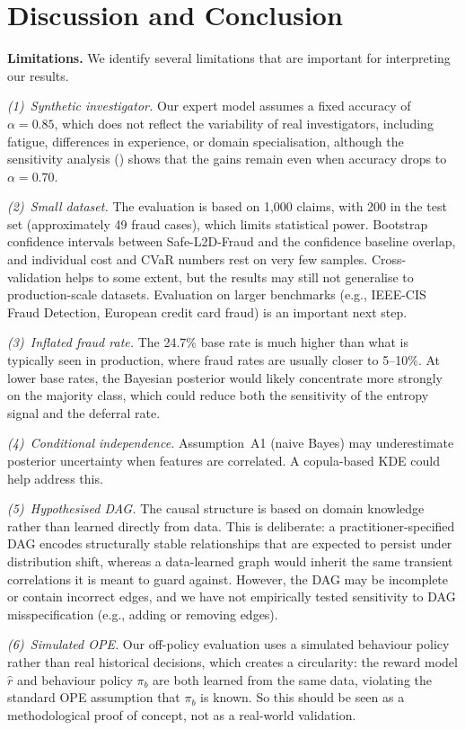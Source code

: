 \section{Discussion and Conclusion}
\label{sec:discussion}
\textbf{Limitations.}
We identify several limitations that are important for interpreting our results.

\textit{(1)~Synthetic investigator.} Our expert model assumes a fixed accuracy of $\alpha = 0.85$, which does not reflect the variability of real investigators, including fatigue, differences in experience, or domain specialisation, although the sensitivity analysis () shows that the gains remain even when accuracy drops to $\alpha = 0.70$.

\textit{(2)~Small dataset.} The evaluation is based on 1{,}000 claims, with 200 in the test set (approximately 49 fraud cases), which limits statistical power. Bootstrap confidence intervals between Safe-L2D-Fraud and the confidence baseline overlap, and individual cost and CVaR numbers rest on very few samples. Cross-validation helps to some extent, but the results may still not generalise to production-scale datasets. Evaluation on larger benchmarks (e.g., IEEE-CIS Fraud Detection, European credit card fraud) is an important next step.

\textit{(3)~Inflated fraud rate.} The 24.7\% base rate is much higher than what is typically seen in production, where fraud rates are usually closer to 5--10\%. At lower base rates, the Bayesian posterior would likely concentrate more strongly on the majority class, which could reduce both the sensitivity of the entropy signal and the deferral rate.

\textit{(4)~Conditional independence.} Assumption~A1 (naive Bayes) may underestimate posterior uncertainty when features are correlated. A copula-based KDE could help address this.

\textit{(5)~Hypothesised DAG.} The causal structure is based on domain knowledge rather than learned directly from data. This is deliberate: a practitioner-specified DAG encodes structurally stable relationships that are expected to persist under distribution shift, whereas a data-learned graph would inherit the same transient correlations it is meant to guard against. However, the DAG may be incomplete or contain incorrect edges, and we have not empirically tested sensitivity to DAG misspecification (e.g., adding or removing edges).

\textit{(6)~Simulated OPE.} Our off-policy evaluation uses a simulated behaviour policy rather than real historical decisions, which creates a circularity: the reward model $\hat{r}$ and behaviour policy $\pi_b$ are both learned from the same data, violating the standard OPE assumption that $\pi_b$ is known. So this should be seen as a methodological proof of concept, not as a real-world validation.


